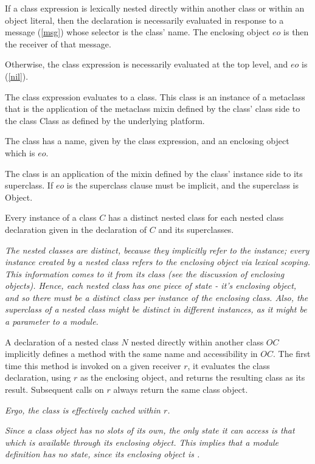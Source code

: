 \documentclass{article}
\newcommand{\code}[1]{{\sf #1}}
\begin{document}
If a class expression is lexically nested directly within another class or within an object literal, then the declaration is necessarily evaluated in response to a message (\ref{msg}) whose selector is the class' name. The enclosing object  $eo$ is then the receiver of that message.

Otherwise, the class expression is necessarily evaluated at the top level, and $eo$ is \NIL{}  (\ref{nil}).
 
The class expression evaluates to a class. This class is an instance of a metaclass that is the application of the metaclass mixin defined by the class' class side to the class \code{Class} as defined by the underlying platform. 

The class has a name, given by the  class expression, and an enclosing object which is $eo$. 
 
The class is an application of the mixin defined by the class' instance side to its superclass.
If $eo$ is \NIL{} the superclass clause must be implicit, and the superclass is \code{Object}.

Every instance of a class $C$ has a distinct nested class for each nested class declaration
given in the declaration of $C$ and its superclasses.

{\it The nested classes are distinct, because they implicitly refer to the instance; every instance created
 by a nested class refers to the enclosing object via lexical scoping.  This information comes
 to it from its class (see the discussion of enclosing objects). Hence, each nested class has
 one piece of state - it's enclosing object,  and so there must be a distinct class per instance
 of the enclosing class. 
 Also, the superclass of a nested class might be distinct in different instances, as it might be a parameter to a module. 
 }

A declaration of a nested class $N$ nested directly within another class $OC$ implicitly defines a method with the same name and accessibility in $OC$. The first time this method is invoked on a given receiver $r$, it evaluates the class declaration, using $r$ as the enclosing object, and returns the resulting class as its result. Subsequent calls on $r$ always return the same class object.

{\it 
Ergo, the class is effectively cached within $r$.
}

{\it
Since a class object has no slots of its own, the only state it can access is that which is available through its enclosing object. This implies that a module definition has no state, since its enclosing object is \NIL.
}
\end{document}
